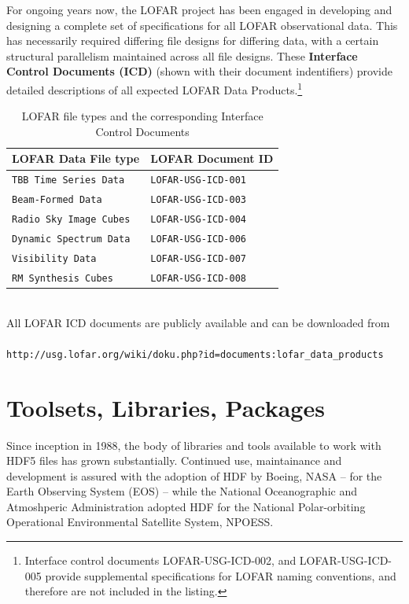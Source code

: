 \documentclass{PoS}
\begin{document}
For ongoing years now, the LOFAR project has been
engaged in  developing and designing a complete set of specifications
for all LOFAR  observational data.  This has necessarily required
differing file designs  for differing data, with a certain structural
parallelism maintained  across all file designs.  These \textbf{Interface Control Documents (ICD)} (shown with their document indentifiers)  provide detailed descriptions of all  expected LOFAR Data Products.\footnote{Interface control documents LOFAR-USG-ICD-002, and LOFAR-USG-ICD-005 provide supplemental specifications for LOFAR naming conventions, and therefore are not included in the listing.}
\begin{table}[h]
  \centering
  \begin{tabular}{|ll|}
    \hline
    \sc LOFAR Data File type& \sc LOFAR Document ID\\ 
\hline \hline
\verb|TBB Time Series Data|  &\verb|LOFAR-USG-ICD-001|\\
\verb|Beam-Formed Data|          &\verb|LOFAR-USG-ICD-003|\\
\verb|Radio Sky Image Cubes|&\verb|LOFAR-USG-ICD-004|\\
\verb|Dynamic Spectrum Data|&\verb|LOFAR-USG-ICD-006|\\
\verb|Visibility Data|            &\verb|LOFAR-USG-ICD-007|\\
\verb|RM Synthesis Cubes|      &\verb|LOFAR-USG-ICD-008|\\
\hline
\end{tabular}
\caption{LOFAR file types and the corresponding Interface Control Documents}
\end{table} 
\\All LOFAR ICD documents are publicly available and can be downloaded from\\\\ \verb|http://usg.lofar.org/wiki/doku.php?id=documents:lofar_data_products|

\section{Toolsets, Libraries, Packages}
Since inception in 1988,  the body of libraries and tools available to work with HDF5 files has grown substantially.  Continued use, maintainance and development is assured with the adoption of HDF by Boeing, NASA -- for the Earth Observing System (EOS) -- while the National Oceanographic and Atmoshperic Administration adopted HDF for the National Polar-orbiting Operational Environmental Satellite System, NPOESS.  
\end{document}
